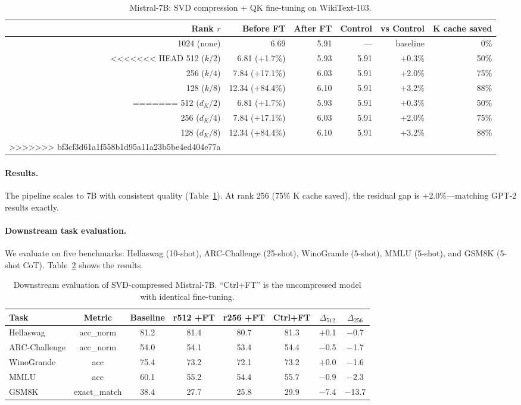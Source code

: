 \documentclass[11pt]{article}
\begin{document}
\begin{table}[h]
\centering
\caption{Mistral-7B: SVD compression + QK fine-tuning on WikiText-103.}
\label{tab:mistral7b}
\begin{tabular}{rrrrrr}
\toprule
Rank $r$ & Before FT & After FT & Control & vs Control & K cache saved \\
\midrule
1024 (none) & 6.69 & 5.91 & --- & baseline & 0\% \\
<<<<<<< HEAD
512 ($k/2$) & 6.81 (+1.7\%) & 5.93 & 5.91 & +0.3\% & 50\% \\
256 ($k/4$) & 7.84 (+17.1\%) & 6.03 & 5.91 & +2.0\% & 75\% \\
128 ($k/8$) & 12.34 (+84.4\%) & 6.10 & 5.91 & +3.2\% & 88\% \\
=======
512 ($d_K/2$) & 6.81 (+1.7\%) & 5.93 & 5.91 & +0.3\% & 50\% \\
256 ($d_K/4$) & 7.84 (+17.1\%) & 6.03 & 5.91 & +2.0\% & 75\% \\
128 ($d_K/8$) & 12.34 (+84.4\%) & 6.10 & 5.91 & +3.2\% & 88\% \\
>>>>>>> bf3cf3d61a1f558b1d95a11a23b5be4ed404e77a
\bottomrule
\end{tabular}
\end{table}

\paragraph{Results.}
The pipeline scales to 7B with consistent quality (Table~\ref{tab:mistral7b}). At rank 256 (75\% K cache saved), the residual gap is +2.0\%---matching GPT-2 results exactly.

\paragraph{Downstream task evaluation.}
We evaluate on five benchmarks: Hellaswag (10-shot), ARC-Challenge (25-shot), WinoGrande (5-shot), MMLU (5-shot), and GSM8K (5-shot CoT). Table~\ref{tab:downstream} shows the results.

\begin{table}[h]
\centering
\caption{Downstream evaluation of SVD-compressed Mistral-7B. ``Ctrl+FT'' is the uncompressed model with identical fine-tuning.}
\label{tab:downstream}
\begin{tabular}{lccccccc}
\toprule
Task & Metric & Baseline & r512 +FT & r256 +FT & Ctrl+FT & $\Delta_{512}$ & $\Delta_{256}$ \\
\midrule
Hellaswag & acc\_norm & 81.2 & 81.4 & 80.7 & 81.3 & $+$0.1 & $-$0.7 \\
ARC-Challenge & acc\_norm & 54.0 & 54.1 & 53.4 & 54.4 & $-$0.5 & $-$1.7 \\
WinoGrande & acc & 75.4 & 73.2 & 72.1 & 73.2 & $+$0.0 & $-$1.6 \\
MMLU & acc & 60.1 & 55.2 & 54.4 & 55.7 & $-$0.9 & $-$2.3 \\
GSM8K & exact\_match & 38.4 & 27.7 & 25.8 & 29.9 & $-$7.4 & $-$13.7 \\
\bottomrule
\end{tabular}
\end{table}
\end{document}
